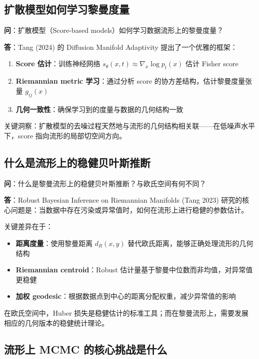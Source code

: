 \subsection{扩散模型如何学习黎曼度量}\label{sec:qa-diffusion-riemannian-metric}

\textbf{问}：扩散模型（Score-based models）如何学习数据流形上的黎曼度量？

\textbf{答}：Tang (2024) 的 Diffusion Manifold Adaptivity 提出了一个优雅的框架：

\begin{enumerate}
    \item \textbf{Score 估计}：训练神经网络 $s_\theta(x, t) \approx \nabla_x \log p_t(x)$ 估计 Fisher score
    \item \textbf{Riemannian metric 学习}：通过分析 score 的协方差结构，估计黎曼度量张量 $g_{ij}(x)$
    \item \textbf{几何一致性}：确保学习到的度量与数据的几何结构一致
\end{enumerate}

关键洞察：扩散模型的去噪过程天然地与流形的几何结构相关联——在低噪声水平下，score 指向流形的局部切空间方向。

\subsection{什么是流形上的稳健贝叶斯推断}\label{sec:qa-robust-bayesian-manifold}

\textbf{问}：什么是黎曼流形上的稳健贝叶斯推断？与欧氏空间有何不同？

\textbf{答}：Robust Bayesian Inference on Riemannian Manifolds (Tang 2023) 研究的核心问题是：当数据中存在污染或异常值时，如何在流形上进行稳健的参数估计。

关键差异在于：

\begin{itemize}
    \item \textbf{距离度量}：使用黎曼距离 $d_R(x, y)$ 替代欧氏距离，能够正确处理流形的几何结构
    \item \textbf{Riemannian centroid}：Robust 估计量基于黎曼中位数而非均值，对异常值更稳健
    \item \textbf{加权 geodesic}：根据数据点到中心的距离分配权重，减少异常值的影响
\end{itemize}

在欧氏空间中，Huber 损失是稳健估计的标准工具；而在黎曼流形上，需要发展相应的几何版本的稳健统计理论。

\subsection{流形上 MCMC 的核心挑战是什么}\label{sec:qa-manifold-mcmc-challenge}

